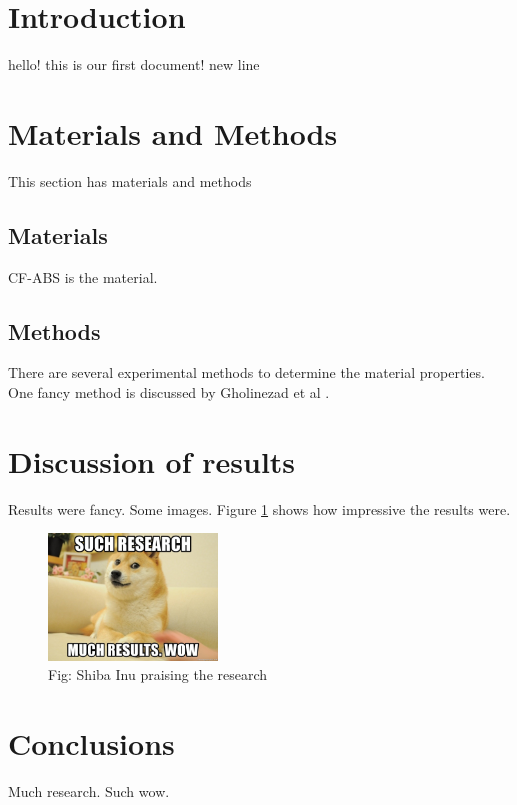 \documentclass[11pt]{article}
\begin{document}
    \section{Introduction}

hello! this is our first document!
new line ~\cite{blom2006detection}
    \section{Materials and Methods}
    This section has materials and methods
    \subsection{Materials}
    CF-ABS is the material.
    \subsection{Methods}
    There are several experimental methods to determine the material properties. One fancy method is discussed by Gholinezad et al \cite{gholinezhad2022non}.

    \section{Discussion of results}
    Results were fancy. Some images. Figure \ref{overflow} shows how impressive the results were.
    \begin{figure}[!ht]
        \centering
        \includegraphics[width= 45mm]{images/wow_doge.jpg}
        \caption{Fig: Shiba Inu praising the research \label{overflow}}
    \end{figure}


    \section{Conclusions}
    Much research. Such wow.


    
    
\end{document}
